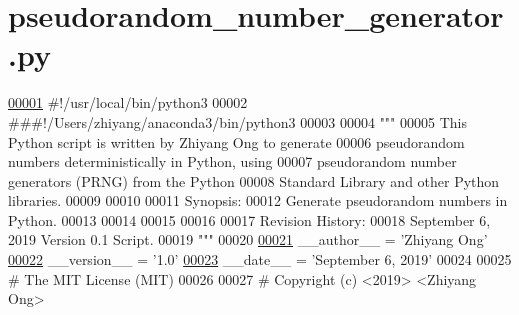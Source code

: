 \hypertarget{pseudorandom__number__generator_8py_source}{}\section{pseudorandom\+\_\+number\+\_\+generator.\+py}
\label{pseudorandom__number__generator_8py_source}

\begin{DoxyCode}
\hypertarget{pseudorandom__number__generator_8py_source_l00001}{}\hyperlink{namespacerandom__process__models_1_1pseudorandom__number__generator}{00001} \textcolor{comment}{#!/usr/local/bin/python3}
00002 \textcolor{comment}{###!/Users/zhiyang/anaconda3/bin/python3}
00003 
00004 \textcolor{stringliteral}{"""}
00005 \textcolor{stringliteral}{    This Python script is written by Zhiyang Ong to generate}
00006 \textcolor{stringliteral}{        pseudorandom numbers deterministically in Python, using}
00007 \textcolor{stringliteral}{        pseudorandom number generators (PRNG) from the Python}
00008 \textcolor{stringliteral}{        Standard Library and other Python libraries.}
00009 \textcolor{stringliteral}{}
00010 \textcolor{stringliteral}{}
00011 \textcolor{stringliteral}{    Synopsis:}
00012 \textcolor{stringliteral}{    Generate pseudorandom numbers in Python.}
00013 \textcolor{stringliteral}{}
00014 \textcolor{stringliteral}{}
00015 \textcolor{stringliteral}{}
00016 \textcolor{stringliteral}{}
00017 \textcolor{stringliteral}{    Revision History:}
00018 \textcolor{stringliteral}{    September 6, 2019           Version 0.1 Script.}
00019 \textcolor{stringliteral}{"""}
00020 
\hypertarget{pseudorandom__number__generator_8py_source_l00021}{}\hyperlink{namespacerandom__process__models_1_1pseudorandom__number__generator_a84092bcc9369063613d90d32f1b312c1}{00021} \_\_author\_\_ = \textcolor{stringliteral}{'Zhiyang Ong'}
\hypertarget{pseudorandom__number__generator_8py_source_l00022}{}\hyperlink{namespacerandom__process__models_1_1pseudorandom__number__generator_a86f3eea01762559cc8455c47914c636b}{00022} \_\_version\_\_ = \textcolor{stringliteral}{'1.0'}
\hypertarget{pseudorandom__number__generator_8py_source_l00023}{}\hyperlink{namespacerandom__process__models_1_1pseudorandom__number__generator_a331fc6d6b9f620aa4f2c18a74db5cb07}{00023} \_\_date\_\_ = \textcolor{stringliteral}{'September 6, 2019'}
00024 
00025 \textcolor{comment}{#   The MIT License (MIT)}
00026 
00027 \textcolor{comment}{#   Copyright (c) <2019> <Zhiyang Ong>}

\end{DoxyCode}
